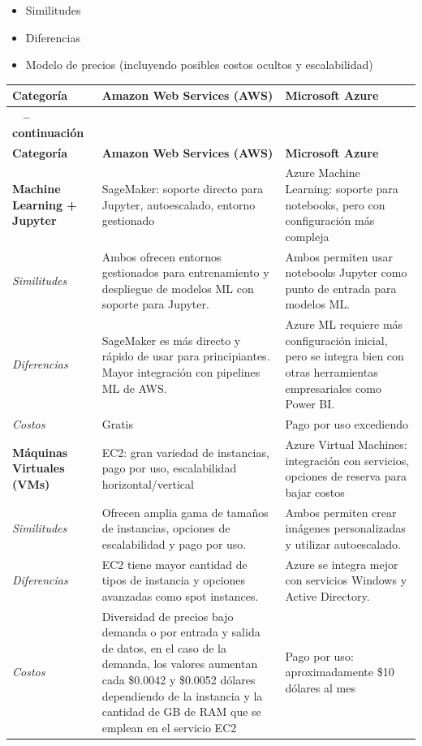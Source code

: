 \documentclass[12pt]{article}
\begin{document}
	\begin{itemize}
		\item Similitudes
		\item Diferencias
		\item Modelo de precios (incluyendo posibles costos ocultos y escalabilidad)
	\end{itemize}
	
	\begin{longtable}{|>{\RaggedRight\arraybackslash}p{4cm}|>{\RaggedRight\arraybackslash}p{5cm}|>{\RaggedRight\arraybackslash}p{5cm}|}
		\hline
		\textbf{Categoría} & \textbf{Amazon Web Services (AWS)} & \textbf{Microsoft Azure} \\
		\hline
		\endfirsthead
		\multicolumn{3}{c}%
		{{\bfseries \tablename\ \thetable{} -- continuación}} \\
		\hline
		\textbf{Categoría} & \textbf{Amazon Web Services (AWS)} & \textbf{Microsoft Azure} \\
		\hline
		\endhead
		\hline
		\endfoot
		
		\textbf{Machine Learning + Jupyter} & SageMaker: soporte directo para Jupyter, autoescalado, entorno gestionado & Azure Machine Learning: soporte para notebooks, pero con configuración más compleja \\
		\textit{Similitudes} & Ambos ofrecen entornos gestionados para entrenamiento y despliegue de modelos ML con soporte para Jupyter. & Ambos permiten usar notebooks Jupyter como punto de entrada para modelos ML. \\
		\textit{Diferencias} & SageMaker es más directo y rápido de usar para principiantes. Mayor integración con pipelines ML de AWS. & Azure ML requiere más configuración inicial, pero se integra bien con otras herramientas empresariales como Power BI. \\
		\textit{Costos} & Gratis & Pago por uso excediendo \\
		\hline
		
		\textbf{Máquinas Virtuales (VMs)} & EC2: gran variedad de instancias, pago por uso, escalabilidad horizontal/vertical & Azure Virtual Machines: integración con servicios, opciones de reserva para bajar costos \\
		\textit{Similitudes} & Ofrecen amplia gama de tamaños de instancias, opciones de escalabilidad y pago por uso. & Ambos permiten crear imágenes personalizadas y utilizar autoescalado. \\
		\textit{Diferencias} & EC2 tiene mayor cantidad de tipos de instancia y opciones avanzadas como spot instances. & Azure se integra mejor con servicios Windows y Active Directory. \\
		\textit{Costos} & Diversidad de precios bajo demanda o por entrada y salida de datos, en el caso de la demanda, los valores aumentan cada \$0.0042 y \$0.0052 dólares dependiendo de la instancia y la cantidad de GB de RAM que se emplean en el servicio EC2 & Pago por uso: aproximadamente \$10 dólares al mes \\
		\hline
		

\end{longtable}
\end{document}

